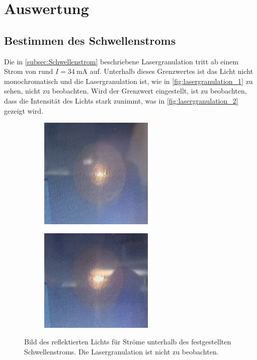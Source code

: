 \section{Auswertung}
\label{sec:Auswertung}

\subsection{Bestimmen des Schwellenstroms}
Die in \autoref{subsec:Schwellenstrom} beschriebene Lasergranulation tritt ab einem Strom von rund $I=\qty{34}{\milli\ampere}$ auf. Unterhalb dieses Grenzwertes ist das Licht
nicht monochromatisch und die Lasergranulation ist, wie in \autoref{fig:lasergranulation_1} zu sehen, nicht zu beobachten. Wird der Grenzwert eingestellt, ist zu beobachten,
dass die Intensität des Lichts stark zunimmt, was in \autoref{fig:lasergranulation_2} gezeigt wird.

  \begin{figure}
    \begin{subfigure}[c]{0.5\textwidth}
        \centering
        \includegraphics[width=0.6\textwidth]{content/pics/30mA.png}
    
    \end{subfigure}
    \begin{subfigure}[c]{0.5\textwidth}
        \centering
        \includegraphics[width=0.6\textwidth]{content/pics/33,5mA.png}
    \end{subfigure}
    \caption{Bild des reflektierten Lichts für Ströme unterhalb des festgestellten Schwellenstroms. Die Lasergranulation ist nicht zu beobachten.}
    \label{fig:lasergranulation_1}
\end{figure}


